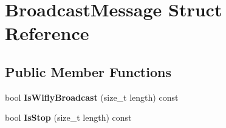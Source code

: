 \hypertarget{struct_broadcast_message}{\section{Broadcast\-Message Struct Reference}
\label{struct_broadcast_message}
}
\subsection*{Public Member Functions}
\begin{DoxyCompactItemize}
\item 
\hypertarget{struct_broadcast_message_a3050a0c141e0bd6d5333f9c7d880842c}{bool {\bfseries Is\-Wifly\-Broadcast} (size\-\_\-t length) const }\label{struct_broadcast_message_a3050a0c141e0bd6d5333f9c7d880842c}

\item 
\hypertarget{struct_broadcast_message_a73ac6b220ef0ffca03cd470ebae1e4ff}{bool {\bfseries Is\-Stop} (size\-\_\-t length) const }\label{struct_broadcast_message_a73ac6b220ef0ffca03cd470ebae1e4ff}

\end{DoxyCompactItemize}
